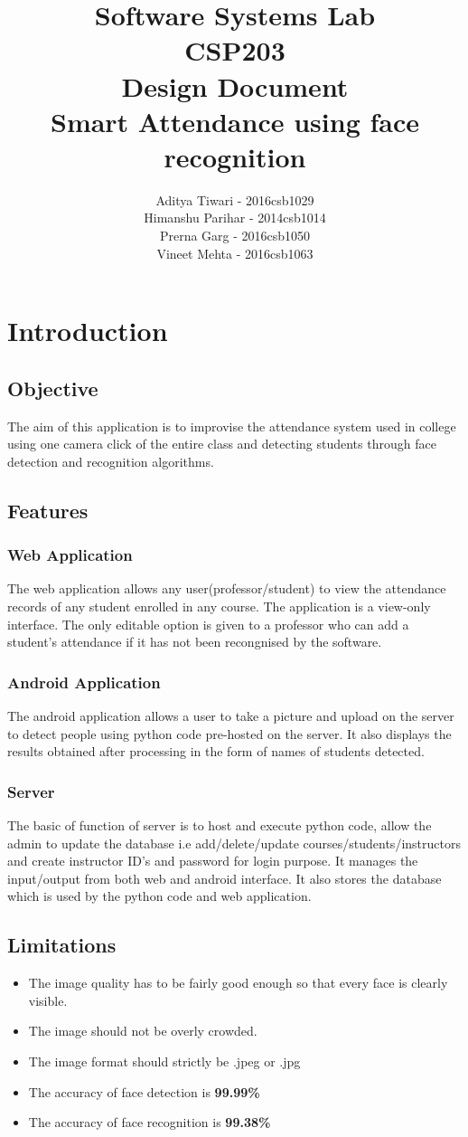 \documentclass{article}
\title{Software Systems Lab\\CSP203\\ Design Document\\ \textbf{Smart Attendance using face recognition}}
\author{Aditya Tiwari - 2016csb1029\\Himanshu Parihar - 2014csb1014 \\ Prerna Garg - 2016csb1050\\Vineet Mehta - 2016csb1063}
\begin{document}
\maketitle
\tableofcontents
\newpage
\section{Introduction}

\subsection{Objective} The aim of this application is to improvise the attendance system used in college using one camera click of the entire class and detecting students through face detection and recognition algorithms.
\subsection{Features} 
\subsubsection{Web Application} The web application allows any user(professor/student) to view the attendance records of any student enrolled in any course. The application is a view-only interface. The only editable option is given to a professor who can add a student's attendance if it has not been recongnised by the software.
\subsubsection{Android Application} The android application allows a user to take a picture and upload on the server to detect people using python code pre-hosted on the server. It also displays the results obtained after processing in the form of names of students detected.
\subsubsection{Server} The basic of function of server is to host and execute python code, allow the admin to update the database i.e add/delete/update courses/students/instructors and create instructor ID's and password for login purpose. It manages the input/output from both web and android interface. It also stores the database which is used by the python code and web application.
\subsection{Limitations}
\begin{itemize}
\item The image quality has to be fairly good enough so that every face is clearly visible.
\item The image should not be overly crowded.
\item The image format should strictly be .jpeg or .jpg
\item The accuracy of face detection is \textbf{99.99\%}
\item The accuracy of face recognition is \textbf{99.38\%}
\end{itemize}
\end{document}

